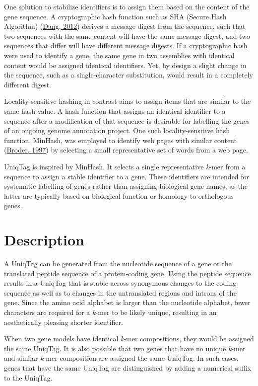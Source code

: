 \documentclass{bioinfo}
\begin{document}
One solution to stabilize identifiers is to assign them based on the
content of the gene sequence. A cryptographic hash function such as SHA
(Secure Hash Algorithm)
(\href{http://www.nist.gov/manuscript-publication-search.cfm?pub_id=910977}{Dang,
2012}) derives a message digest from the sequence, such that two
sequences with the same content will have the same message digest, and
two sequences that differ will have different message digests. If a
cryptographic hash were used to identify a gene, the same gene in two
assemblies with identical content would be assigned identical
identifiers. Yet, by design a slight change in the sequence, such as a
single-character substitution, would result in a completely different
digest.

Locality-sensitive hashing in contrast aims to assign items that are
similar to the same hash value. A hash function that assigns an
identical identifier to a sequence after a modification of that sequence
is desirable for labelling the genes of an ongoing genome annotation
project. One such locality-sensitive hash function, MinHash, was
employed to identify web pages with similar content
(\href{http://dx.doi.org/10.1109/SEQUEN.1997.666900}{Broder, 1997}) by
selecting a small representative set of words from a web page.

UniqTag is inspired by MinHash. It selects a single representative
\emph{k}-mer from a sequence to assign a stable identifier to a gene.
These identifiers are intended for systematic labelling of genes rather
than assigning biological gene names, as the latter are typically based
on biological function or homology to orthologous genes.

\section{Description}\label{description}

A UniqTag can be generated from the nucleotide sequence of a gene or the
translated peptide sequence of a protein-coding gene. Using the peptide
sequence results in a UniqTag that is stable across synonymous changes
to the coding sequence as well as to changes in the untranslated regions
and introns of the gene. Since the amino acid alphabet is larger than
the nucleotide alphabet, fewer characters are required for a
\emph{k}-mer to be likely unique, resulting in an aesthetically pleasing
shorter identifier.

When two gene models have identical \emph{k}-mer compositions, they
would be assigned the same UniqTag. It is also possible that two genes
that have no unique \emph{k}-mer and similar \emph{k}-mer composition
are assigned the same UniqTag. In such cases, genes that have the same
UniqTag are distinguished by adding a numerical suffix to the UniqTag.
\end{document}
